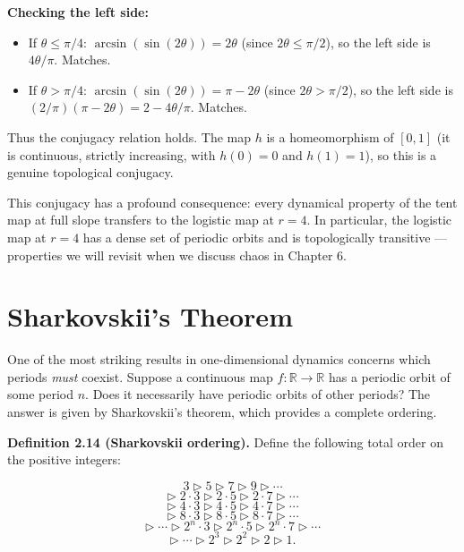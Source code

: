 \textbf{Checking the left side:}
\begin{itemize}[nosep]
  \item If $\theta \leq \pi/4$: $\arcsin(\sin(2\theta)) = 2\theta$ (since $2\theta \leq \pi/2$), so the left side is $4\theta/\pi$. Matches.
  \item If $\theta > \pi/4$: $\arcsin(\sin(2\theta)) = \pi - 2\theta$ (since $2\theta > \pi/2$), so the left side is $(2/\pi)(\pi - 2\theta) = 2 - 4\theta/\pi$. Matches.
\end{itemize}

Thus the conjugacy relation holds. The map $h$ is a homeomorphism of $[0,1]$ (it is continuous, strictly increasing, with $h(0) = 0$ and $h(1) = 1$), so this is a genuine topological conjugacy.

This conjugacy has a profound consequence: every dynamical property of the tent map at full slope transfers to the logistic map at $r = 4$. In particular, the logistic map at $r = 4$ has a dense set of periodic orbits and is topologically transitive --- properties we will revisit when we discuss chaos in Chapter 6.


\section{Sharkovskii's Theorem}\label{sec:2.7}

One of the most striking results in one-dimensional dynamics concerns which periods \textit{must} coexist. Suppose a continuous map $f: \mathbb{R} \to \mathbb{R}$ has a periodic orbit of some period $n$. Does it necessarily have periodic orbits of other periods? The answer is given by Sharkovskii's theorem, which provides a complete ordering.

\textbf{Definition 2.14 (Sharkovskii ordering).} Define the following total order on the positive integers:

\[
3 \triangleright 5 \triangleright 7 \triangleright 9 \triangleright \cdots
\]
\[
\triangleright \; 2 \cdot 3 \triangleright 2 \cdot 5 \triangleright 2 \cdot 7 \triangleright \cdots
\]
\[
\triangleright \; 4 \cdot 3 \triangleright 4 \cdot 5 \triangleright 4 \cdot 7 \triangleright \cdots
\]
\[
\triangleright \; 8 \cdot 3 \triangleright 8 \cdot 5 \triangleright 8 \cdot 7 \triangleright \cdots
\]
\[
\triangleright \; \cdots \triangleright 2^n \cdot 3 \triangleright 2^n \cdot 5 \triangleright 2^n \cdot 7 \triangleright \cdots
\]
\[
\triangleright \; \cdots \triangleright 2^3 \triangleright 2^2 \triangleright 2 \triangleright 1.
\]

